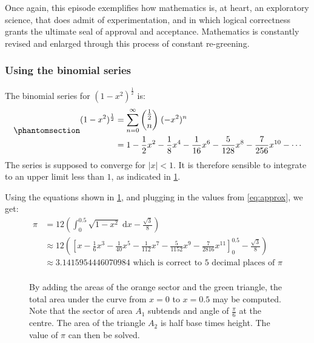 \documentclass[
  a4paper,
]{article}
\begin{document}
Once again, this episode exemplifies how mathematics is, at heart, an
exploratory science, that does admit of experimentation, and in which
logical correctness grants the ultimate seal of approval and acceptance.
Mathematics is constantly revised and enlarged through this process of
constant re-greening.

\subsubsection{Using the binomial
series}\label{using-the-binomial-series}

The binomial series for \((1 - x^2)^{\frac{1}{2}}\) is:
\begin{equation}\phantomsection\label{eq:approx}{
\begin{aligned}
(1 - x^2)^{\frac{1}{2}} &= \sum^{\infty}_{n=0}\binom{\frac{1}{2}}{n}\;(-x^2)^n\\
&= 1 - \frac{1}{2}x^2 - \frac{1}{8}x^4 - \frac{1}{16}x^6 - \frac{5}{128}x^8 - \frac{7}{256}x^{10} - \cdots
\end{aligned}
}\end{equation} The series is supposed to converge for
\(\lvert{x}\rvert < 1\). It is therefore sensible to integrate to an
upper limit less than \(1\), as indicated in \cref{fig:sixty-degrees}.

Using the equations shown in \cref{fig:sixty-degrees}, and plugging in
the values from \cref{eq:approx}, we get: \[
\begin{aligned}
\pi &= 12\left(\int_{0}^{0.5}\sqrt{1 - x^2}\; \mathrm{d}x - \frac{\sqrt{3}}{8} \right)\\
&\approx 12 \left(\left[x - \frac{1}{6}x^3 - \frac{1}{40}x^5 - \frac{1}{112}x^7 - \frac{5}{1152}x^9 - \frac{7}{2816}x^{11} \right]_{0}^{0.5} - \frac{\sqrt{3}}{8}\right)\\
&\approx 3.1415954446070984 \text{ which is correct to 5 decimal places of }\pi\\
\end{aligned}
\]

\begin{figure}
\centering

\caption{By adding the areas of the orange sector and the green
triangle, the total area under the curve from \(x = 0\) to \(x = 0.5\)
may be computed. Note that the sector of area \(A_1\) subtends and angle
of \(\frac{\pi}{6}\) at the centre. The area of the triangle \(A_2\) is
half base times height. The value of \(\pi\) can then be
solved.}\label{fig:sixty-degrees}
\end{figure}
\end{document}
